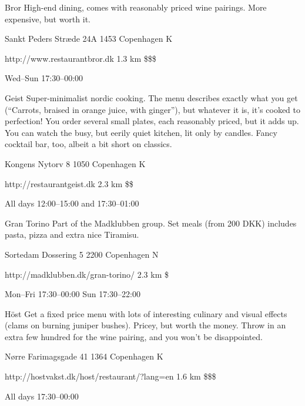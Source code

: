 \begin{left}
\begin{eventitem}
\begin{eventitem}
\begin{eventitem}
\begin{fooditem}
{Bror}
{High-end dining, comes with reasonably priced wine pairings. More expensive, but worth it.}
{\begin{addr}
{Sankt Peders Stræde 24A}
{1453 Copenhagen K}
\end{addr}}
{http://www.restaurantbror.dk }
{1.3 km}
{\$\$\$}
{\begin{ohours}
{Wed–Sun}
{17:30–00:00}
{}
{}
{}
{}
{}
{}
\end{ohours}}
\end{fooditem}
\begin{fooditem}
{Geist}
{Super-minimalist nordic cooking. The menu describes exactly what you get (“Carrots, braised in orange juice, with ginger”), but whatever it is, it’s cooked to perfection! You order several small plates, each reasonably priced, but it adds up. You can watch the busy, but eerily quiet kitchen, lit only by candles. Fancy cocktail bar, too, albeit a bit short on classics.}
{\begin{addr}
{Kongens Nytorv 8}
{1050 Copenhagen K}
\end{addr}}
{http://restaurantgeist.dk}
{2.3 km}
{\$\$}
{\begin{ohours}
{All days}
{12:00–15:00 and 17:30–01:00}
{}
{}
{}
{}
{}
{}
\end{ohours}}
\end{fooditem}
\begin{fooditem}
{Gran Torino}
{Part of the Madklubben group. Set meals (from 200 DKK) includes pasta, pizza and extra nice Tiramisu.}
{\begin{addr}
{Sortedam Dossering 5}
{2200 Copenhagen N}
\end{addr}}
{http://madklubben.dk/gran-torino/}
{2.3 km}
{\$}
{\begin{ohours}
{Mon–Fri}
{17:30–00:00}
{Sun}
{17:30–22:00}
{}
{}
{}
{}
\end{ohours}}
\end{fooditem}
\begin{fooditem}
{Höst}
{Get a fixed price menu with lots of interesting culinary and visual effects (clams on burning juniper bushes). Pricey, but worth the money. Throw in an extra few hundred for the wine pairing, and you won't be disappointed.}
{\begin{addr}
{Nørre Farimagsgade 41}
{1364 Copenhagen K}
\end{addr}}
{http://hostvakst.dk/host/restaurant/?lang=en}
{1.6 km}
{\$\$\$}
{\begin{ohours}
{All days}
{17:30–00:00}
{}

\end{ohours}}
\end{fooditem}
\end{eventitem}
\end{eventitem}
\end{eventitem}
\end{left}
